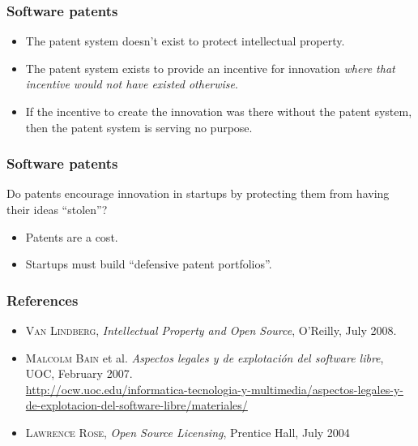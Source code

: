 \begin{frame}
\frametitle{Software patents}

\begin{itemize}
\item The patent system doesn't exist to protect intellectual property.
\item The patent system exists to provide an incentive for innovation \textit{where that incentive would not have existed otherwise}.
\item If the incentive to create the innovation was there without the patent system, then the patent system is serving no purpose.
\end{itemize}

\end{frame}

\begin{frame}
\frametitle{Software patents}

Do patents encourage innovation in startups by protecting them from having their ideas ``stolen''?

\pause

\begin{itemize}
\item Patents are a cost.
\item Startups must build ``defensive patent portfolios''.
\end{itemize}

\end{frame}


\begin{frame}
\frametitle{References}

\begin{itemize}
\item \textsc{Van Lindberg}, \textit{Intellectual Property and Open Source}, O'Reilly, July 2008.
\item \textsc{Malcolm Bain} et al. \textit{Aspectos legales y de explotación del software libre}, UOC, February 2007. \\
\url{http://ocw.uoc.edu/informatica-tecnologia-y-multimedia/aspectos-legales-y-de-explotacion-del-software-libre/materiales/}
\item \textsc{Lawrence Rose}, \textit{Open Source Licensing}, Prentice Hall, July 2004 
\end{itemize}

\end{frame}





